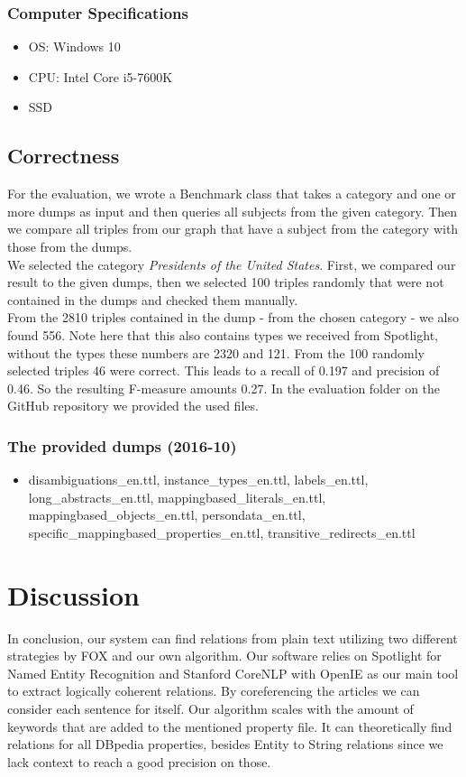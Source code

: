 \documentclass[runningheads]{llncs}
\begin{document}
\subsubsection{Computer Specifications}
\begin{itemize} 
	\item OS: Windows 10 
	\item CPU: Intel Core i5-7600K 
	\item SSD
\end{itemize}
\subsection{Correctness}
For the evaluation, we wrote a Benchmark class that takes a category and one or more dumps as input and then queries all subjects from the given category. Then we compare all triples from our graph that have a subject from the category with those from the dumps. \\

We selected the category \textit{Presidents of the United States}. First, we compared our result to the given dumps, then we selected 100 triples randomly that were not contained in the dumps and checked them manually.\\

From the 2810 triples contained in the dump - from the chosen category - we also found 556. Note here that this also contains types we received from Spotlight, without the types these numbers are 2320 and 121. From the 100 randomly selected triples 46 were correct. This leads to a recall 
of 0.197 and precision of 0.46. So the resulting F-measure amounts 0.27. In the evaluation folder on the GitHub repository we provided the used files.
\subsubsection{The provided dumps (2016-10)} 
\begin{itemize} 
	\item disambiguations\_en.ttl, instance\_types\_en.ttl, labels\_en.ttl, long\_abstracts\_en.ttl,
	mappingbased\_literals\_en.ttl, mappingbased\_objects\_en.ttl, persondata\_en.ttl, specific\_mappingbased\_properties\_en.ttl, transitive\_redirects\_en.ttl
\end{itemize}


\section{Discussion}
In conclusion, our system can find relations from plain text utilizing two different strategies by FOX and our own algorithm. Our software relies on Spotlight for Named Entity Recognition and Stanford CoreNLP with OpenIE as our main tool to extract logically coherent relations.
By coreferencing the articles we can consider each sentence for itself. Our algorithm scales with the amount of keywords that are added to the mentioned property file. It can theoretically find relations for all DBpedia properties, besides Entity to String relations since we lack context to reach a good precision on those. \\ 
\end{document}
